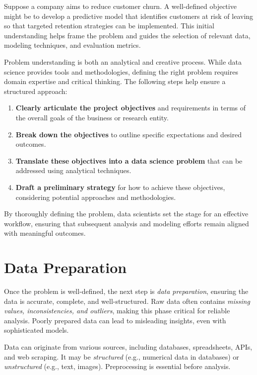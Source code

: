 \documentclass[
  11pt,
]{book}
\providecommand{\tightlist}{%
  \setlength{\itemsep}{0pt}\setlength{\parskip}{0pt}}
\theoremstyle{definition}
\theoremstyle{definition}
\theoremstyle{definition}
\theoremstyle{definition}
\theoremstyle{remark}
\begin{document}
Suppose a company aims to reduce customer churn. A well-defined objective might be to develop a predictive model that identifies customers at risk of leaving so that targeted retention strategies can be implemented. This initial understanding helps frame the problem and guides the selection of relevant data, modeling techniques, and evaluation metrics.

Problem understanding is both an analytical and creative process. While data science provides tools and methodologies, defining the right problem requires domain expertise and critical thinking. The following steps help ensure a structured approach:

\begin{enumerate}
\def\labelenumi{\arabic{enumi}.}
\tightlist
\item
  \textbf{Clearly articulate the project objectives} and requirements in terms of the overall goals of the business or research entity.
\item
  \textbf{Break down the objectives} to outline specific expectations and desired outcomes.
\item
  \textbf{Translate these objectives into a data science problem} that can be addressed using analytical techniques.
\item
  \textbf{Draft a preliminary strategy} for how to achieve these objectives, considering potential approaches and methodologies.
\end{enumerate}

By thoroughly defining the problem, data scientists set the stage for an effective workflow, ensuring that subsequent analysis and modeling efforts remain aligned with meaningful outcomes.

\section{Data Preparation}\label{data-preparation}

Once the problem is well-defined, the next step is \emph{data preparation}, ensuring the data is accurate, complete, and well-structured. Raw data often contains \emph{missing values, inconsistencies, and outliers}, making this phase critical for reliable analysis. Poorly prepared data can lead to misleading insights, even with sophisticated models.

Data can originate from various sources, including databases, spreadsheets, APIs, and web scraping. It may be \emph{structured} (e.g., numerical data in databases) or \emph{unstructured} (e.g., text, images). Preprocessing is essential before analysis.
\end{document}
